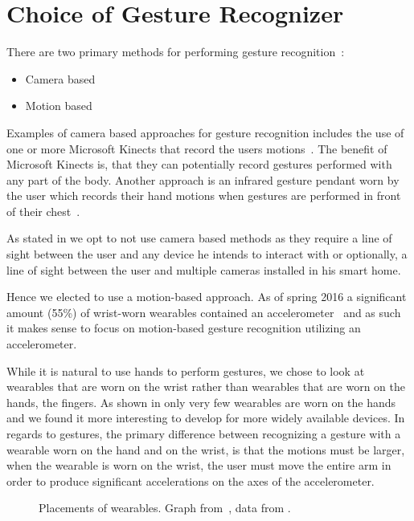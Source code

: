 \section{Choice of Gesture Recognizer}
\label{sec:analysis:choice-of-gesture-recognizer}

There are two primary methods for performing gesture recognition~\cite[pp. 19-21]{prespecialisation}:

\begin{itemize}
\item Camera based
\item Motion based
\end{itemize}

Examples of camera based approaches for gesture recognition includes the use of one or more Microsoft Kinects that record the users motions~\cite{caon2011context}. The benefit of Microsoft Kinects is, that they can potentially record gestures performed with any part of the body. Another approach is an infrared gesture pendant worn by the user which records their hand motions when gestures are performed in front of their chest~\cite{starner2000gesture}.

As stated in  we opt to not use camera based methods as they require a line of sight between the user and any device he intends to interact with or optionally, a line of sight between the user and multiple cameras installed in his smart home.

Hence we elected to use a motion-based approach. As of spring 2016 a significant amount (55\%) of wrist-worn wearables contained an accelerometer~\cite[pp. 2-3]{prespecialisation} and as such it makes sense to focus on motion-based gesture recognition utilizing an accelerometer.

While it is natural to use hands to perform gestures, we chose to look at wearables that are worn on the wrist rather than wearables that are worn on the hands, \eg the fingers. As shown in  only very few wearables are worn on the hands and we found it more interesting to develop for more widely available devices. In regards to gestures, the primary difference between recognizing a gesture with a wearable worn on the hand and on the wrist, is that the motions must be larger, when the wearable is worn on the wrist, \ie the user must move the entire arm in order to produce significant accelerations on the axes of the accelerometer.

\begin{figure}[!htb]
  \centering
  
  \caption{Placements of wearables. Graph from~\cite[p. 2]{prespecialisation}, data from \protect\cite{LISTOFWEARABLES}.}
\label{fig:wearables-placement}
\end{figure}

